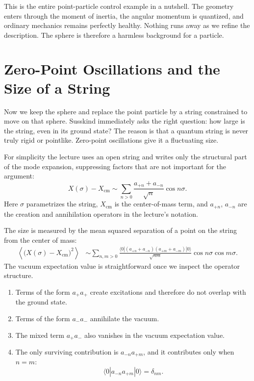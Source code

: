 This is the entire point-particle control example in a nutshell. The geometry enters through the moment of inertia, the angular momentum is quantized, and ordinary mechanics remains perfectly healthy. Nothing runs away as we refine the description. The sphere is therefore a harmless background for a particle.

\section{Zero-Point Oscillations and the Size of a String}

Now we keep the sphere and replace the point particle by a string constrained to move on that sphere. Susskind immediately asks the right question: how large is the string, even in its ground state? The reason is that a quantum string is never truly rigid or pointlike. Zero-point oscillations give it a fluctuating size.

For simplicity the lecture uses an open string and writes only the structural part of the mode expansion, suppressing factors that are not important for the argument:
\begin{equation}
X(\sigma)-X_{\mathrm{cm}}
\sim
\sum_{n>0}\frac{a_{+n}+a_{-n}}{\sqrt{n}}\cos n\sigma.
\end{equation}
Here \(\sigma\) parametrizes the string, \(X_{\mathrm{cm}}\) is the center-of-mass term, and \(a_{+n}\), \(a_{-n}\) are the creation and annihilation operators in the lecture's notation.

The size is measured by the mean squared separation of a point on the string from the center of mass:
\begin{align}
\left\langle \bigl(X(\sigma)-X_{\mathrm{cm}}\bigr)^2 \right\rangle
&\sim
\sum_{n,m>0}
\frac{
\langle 0|(a_{+n}+a_{-n})(a_{+m}+a_{-m})|0\rangle
}{\sqrt{nm}}
\cos n\sigma \cos m\sigma.
\end{align}
The vacuum expectation value is straightforward once we inspect the operator structure.

\begin{enumerate}
\item Terms of the form \(a_{+}a_{+}\) create excitations and therefore do not overlap with the ground state.
\item Terms of the form \(a_{-}a_{-}\) annihilate the vacuum.
\item The mixed term \(a_{+}a_{-}\) also vanishes in the vacuum expectation value.
\item The only surviving contribution is \(a_{-n}a_{+m}\), and it contributes only when \(n=m\):
\begin{equation}
\langle 0|a_{-n}a_{+m}|0\rangle=\delta_{nm}.
\end{equation}
\end{enumerate}

